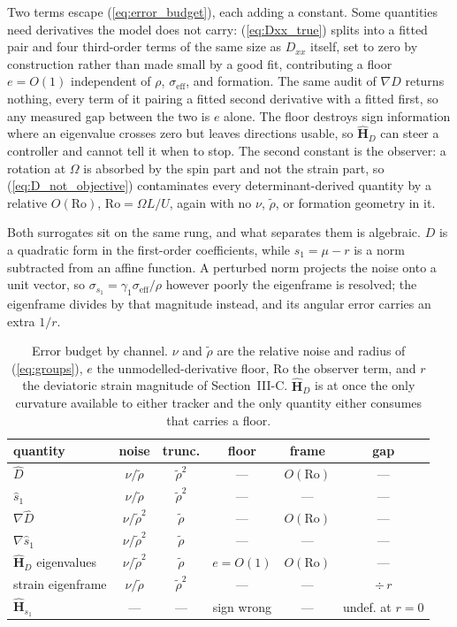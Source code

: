 Two terms escape (\ref{eq:error_budget}), each adding a constant. Some
quantities need derivatives the model does not carry:
(\ref{eq:Dxx_true}) splits into a fitted pair and four third-order terms
of the same size as $D_{xx}$ itself, set to zero by construction rather
than made small by a good fit, contributing a floor $e = O(1)$
independent of $\rho$, $\sigma_{\mathrm{eff}}$, and formation.
The same audit of $\nabla D$ returns nothing, every term of it pairing a
fitted second derivative with a fitted first, so any measured gap
between the two is $e$ alone. The floor destroys sign information where
an eigenvalue crosses zero but leaves directions usable, so
$\hat{\mathbf{H}}_D$ can steer a controller and cannot tell it when to
stop. The second constant
is the observer: a rotation at $\Omega$ is absorbed by the spin part and
not the strain part, so (\ref{eq:D_not_objective}) contaminates every
determinant-derived quantity by a relative $O(\mathrm{Ro})$,
$\mathrm{Ro} = \Omega L/U$, again with no $\nu$, $\tilde{\rho}$, or
formation geometry in it.

Both surrogates sit on the same rung, and what separates them is
algebraic. $D$ is a quadratic form in the first-order coefficients,
while $s_1 = \mu - r$ is a norm subtracted from an affine function. A
perturbed norm projects the noise onto a unit vector, so $\sigma_{s_1} =
\gamma_1\sigma_{\mathrm{eff}}/\rho$ however poorly the eigenframe is
resolved; the eigenframe divides by that magnitude instead, and its
angular error carries an extra $1/r$.

\begin{table}[!t]
\centering
\caption{Error budget by channel. $\nu$ and $\tilde{\rho}$ are the
relative noise and radius of (\ref{eq:groups}), $e$ the
unmodelled-derivative floor, $\mathrm{Ro}$ the observer term, and $r$
the deviatoric strain magnitude of Section~\mbox{III-C}.
$\hat{\mathbf{H}}_D$ is at once the only curvature available to either
tracker and the only quantity either consumes that carries a floor.}
\label{tab:budget}
\footnotesize
\setlength{\tabcolsep}{4pt}
\begin{tabular}{@{}lccccc@{}}
\hline
quantity & noise & trunc. & floor & frame & gap \\
\hline
$\hat{D}$ & $\nu/\tilde{\rho}$ & $\tilde{\rho}^2$ & --- & $O(\mathrm{Ro})$ & --- \\
$\hat{s}_1$ & $\nu/\tilde{\rho}$ & $\tilde{\rho}^2$ & --- & --- & --- \\
$\nabla\hat{D}$ & $\nu/\tilde{\rho}^2$ & $\tilde{\rho}$ & --- & $O(\mathrm{Ro})$ & --- \\
$\nabla\hat{s}_1$ & $\nu/\tilde{\rho}^2$ & $\tilde{\rho}$ & --- & --- & --- \\
$\hat{\mathbf{H}}_D$ eigenvalues & $\nu/\tilde{\rho}^2$ & $\tilde{\rho}$ & $e = O(1)$ & $O(\mathrm{Ro})$ & --- \\
strain eigenframe & $\nu/\tilde{\rho}$ & $\tilde{\rho}^2$ & --- & --- & $\div\,r$ \\
$\hat{\mathbf{H}}_{s_1}$ & --- & --- & sign wrong & --- & undef. at $r=0$ \\
\hline
\end{tabular}
\end{table}

